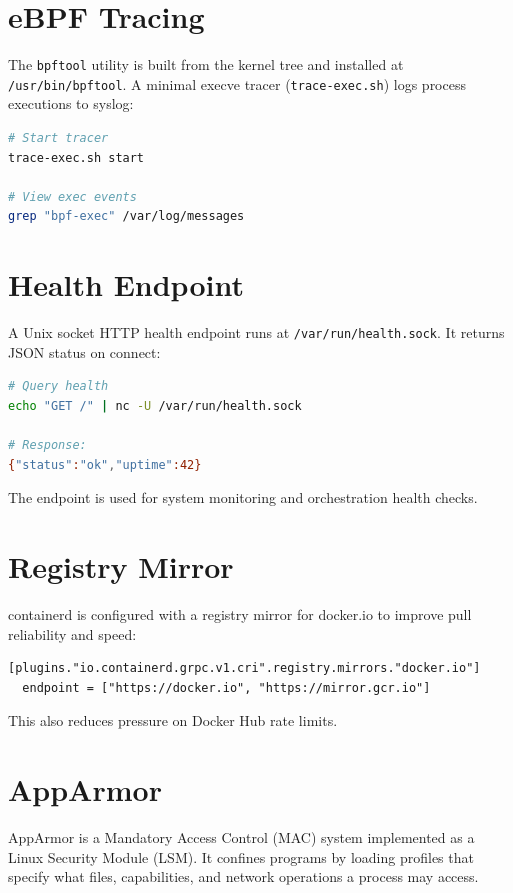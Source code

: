 \section{eBPF Tracing}

The \texttt{bpftool} utility is built from the kernel tree and installed
at \texttt{/usr/bin/bpftool}. A minimal execve tracer
(\texttt{trace-exec.sh}) logs process executions to syslog:

\begin{lstlisting}[language=bash]
# Start tracer
trace-exec.sh start

# View exec events
grep "bpf-exec" /var/log/messages
\end{lstlisting}

\section{Health Endpoint}

A Unix socket HTTP health endpoint runs at \texttt{/var/run/health.sock}.
It returns JSON status on connect:

\begin{lstlisting}[language=bash]
# Query health
echo "GET /" | nc -U /var/run/health.sock

# Response:
{"status":"ok","uptime":42}
\end{lstlisting}

The endpoint is used for system monitoring and orchestration health
checks.

\section{Registry Mirror}

containerd is configured with a registry mirror for docker.io to improve
pull reliability and speed:

\begin{lstlisting}
[plugins."io.containerd.grpc.v1.cri".registry.mirrors."docker.io"]
  endpoint = ["https://docker.io", "https://mirror.gcr.io"]
\end{lstlisting}

This also reduces pressure on Docker Hub rate limits.

\section{AppArmor}

AppArmor is a Mandatory Access Control (MAC) system implemented as a
Linux Security Module (LSM). It confines programs by loading profiles
that specify what files, capabilities, and network operations a process
may access.

